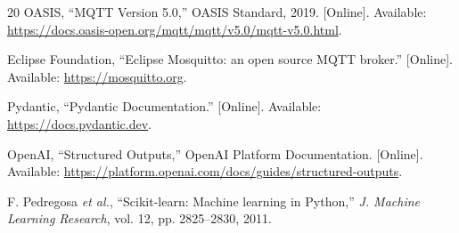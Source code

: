 \documentclass[conference]{IEEEtran}
\begin{document}
\begin{thebibliography}{20}
OASIS,
``MQTT Version 5.0,''
OASIS Standard, 2019.
[Online]. Available:
\url{https://docs.oasis-open.org/mqtt/mqtt/v5.0/mqtt-v5.0.html}.

Eclipse Foundation,
``Eclipse Mosquitto: an open source MQTT broker.''
[Online]. Available:
\url{https://mosquitto.org}.

Pydantic,
``Pydantic Documentation.''
[Online]. Available:
\url{https://docs.pydantic.dev}.

OpenAI,
``Structured Outputs,''
OpenAI Platform Documentation.
[Online]. Available:
\url{https://platform.openai.com/docs/guides/structured-outputs}.

F. Pedregosa \emph{et al.},
``Scikit-learn: Machine learning in Python,''
\emph{J. Machine Learning Research},
vol. 12, pp. 2825--2830, 2011.

\end{thebibliography}
\end{document}
